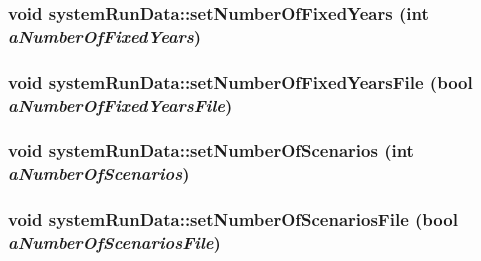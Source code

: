 \label{classsystem_run_data_a1fc08424c4b79e344456650391c2a403}
\hypertarget{classsystem_run_data_a3c4165b768b3b87393cb3dfd032aedbc}{
\subsubsection[{setNumberOfFixedYears}]{\setlength{\rightskip}{0pt plus 5cm}void systemRunData::setNumberOfFixedYears (int {\em aNumberOfFixedYears})}}
\label{classsystem_run_data_a3c4165b768b3b87393cb3dfd032aedbc}
\hypertarget{classsystem_run_data_a7d0177163f26671a060f29d7422aae43}{
\subsubsection[{setNumberOfFixedYearsFile}]{\setlength{\rightskip}{0pt plus 5cm}void systemRunData::setNumberOfFixedYearsFile (bool {\em aNumberOfFixedYearsFile})}}
\label{classsystem_run_data_a7d0177163f26671a060f29d7422aae43}
\hypertarget{classsystem_run_data_a915b959ef28738053a3f08d12e68cef8}{
\subsubsection[{setNumberOfScenarios}]{\setlength{\rightskip}{0pt plus 5cm}void systemRunData::setNumberOfScenarios (int {\em aNumberOfScenarios})}}
\label{classsystem_run_data_a915b959ef28738053a3f08d12e68cef8}
\hypertarget{classsystem_run_data_a4cafdae5fe793c31745b55d8b4df93b6}{
\subsubsection[{setNumberOfScenariosFile}]{\setlength{\rightskip}{0pt plus 5cm}void systemRunData::setNumberOfScenariosFile (bool {\em aNumberOfScenariosFile})}}
